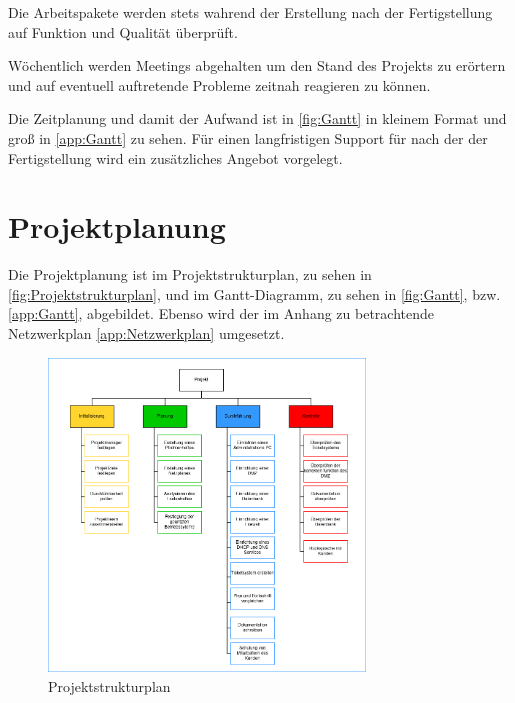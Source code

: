 \documentclass[a4paper,12pt,headings=small,ngerman,bibliography=totoc]{scrartcl}
\begin{document}
Die Arbeitspakete werden stets wahrend der Erstellung nach der Fertigstellung auf Funktion und Qualität überprüft.

Wöchentlich werden Meetings abgehalten um den Stand des Projekts zu erörtern und auf eventuell auftretende Probleme zeitnah reagieren zu können.

Die Zeitplanung und damit der Aufwand ist in \vref{fig:Gantt} in kleinem Format und groß in \vref{app:Gantt} zu sehen.  Für einen langfristigen Support für nach der der Fertigstellung wird ein zusätzliches Angebot vorgelegt.


\section{Projektplanung}

Die Projektplanung ist im Projektstrukturplan, zu sehen in \vref{fig:Projektstrukturplan}, und im Gantt-Diagramm, zu sehen in \vref{fig:Gantt}, bzw. \vref{app:Gantt}, abgebildet.
Ebenso wird der im Anhang  zu betrachtende Netzwerkplan \vref{app:Netzwerkplan} umgesetzt.

\begin{figure}[htbp]
  \centering
  \includegraphics[width=0.75\textwidth]{data/Projektstrukturplan.png}
  \caption{Projektstrukturplan}
  \label{fig:Projektstrukturplan}
\end{figure}
\end{document}

